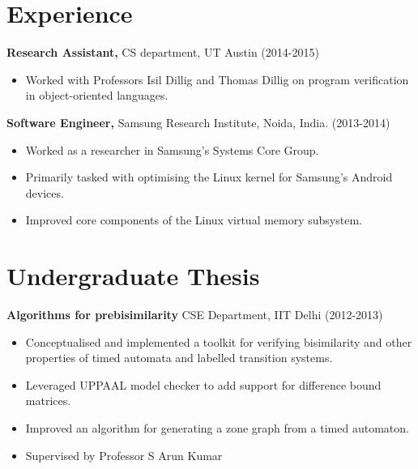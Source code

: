 \documentclass[margin]{res}
\begin{document}
\begin{resume}
\section{Experience}

 {\bf Research Assistant,} CS department, UT Austin \hfill (2014-2015)
 \begin{itemize} \itemsep -2pt  %
 \item Worked with Professors Isil Dillig and Thomas Dillig on program
   verification in object-oriented languages.
 \end{itemize}
 
 {\bf Software Engineer,} Samsung Research Institute, Noida, India. \hfill (2013-2014)
 \begin{itemize} \itemsep -2pt  %
 \item Worked as a researcher in Samsung's Systems Core Group.
 \item Primarily tasked with optimising the Linux kernel for Samsung's
   Android devices.
 \item Improved core components of the Linux virtual memory subsystem.
 \end{itemize}

 
\section{Undergraduate Thesis} 
               {\bf Algorithms for prebisimilarity} CSE Department,
               IIT Delhi    \hfill         (2012-2013)
                \begin{itemize} \itemsep -2pt
                \item Conceptualised and implemented a toolkit for
                  verifying bisimilarity and other properties of timed automata
                  and labelled transition systems.
                \item Leveraged UPPAAL model checker to add support
                  for difference bound matrices.
                \item Improved an algorithm for generating a zone
                  graph from a timed automaton.
                \item Supervised by Professor S Arun Kumar

		\end{itemize}




\end{resume}
\end{document}
